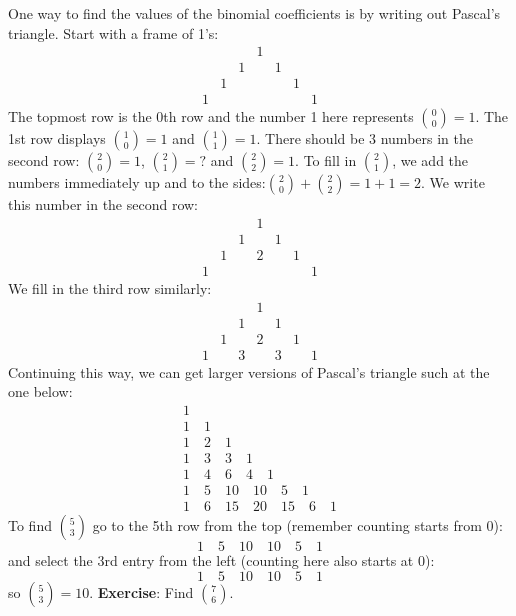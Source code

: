 One way to find the values of the binomial coefficients is by writing out Pascal's triangle. Start with a frame of 1's:
\begin{equation*}
    \begin{matrix}
         & & &1& & &\\ 
         & &1& &1& & \\ 
         &1& & & &1& \\
        1& & & & & &1
    \end{matrix}
\end{equation*}
The topmost row is the 0th row and the number 1 here represents $\binom{0}{0} = 1$. The 1st row displays $\binom{1}{0} = 1$ and $\binom{1}{1} = 1$. 
There should be 3 numbers in the second row: $\binom{2}{0} = 1$, $\binom{2}{1} = ?$ and $\binom{2}{2} = 1$. To fill in $\binom{2}{1}$, we add the numbers 
immediately up and to the sides:$\binom{2}{0} + \binom{2}{2} = 1 + 1 = 2$. We write this number in the second row:
\begin{equation*}
    \begin{matrix}
         & & &1& & &\\ 
         & &\boxed{1}& &\boxed{1}& & \\ 
         &1& &\boxed{2}& &1& \\
        1& & & & & &1
    \end{matrix}
\end{equation*}
We fill in the third row similarly:
\begin{equation*}
    \begin{matrix}
         & & &1& & &\\ 
         & &1& &1& & \\ 
         &1& &2& &1& \\
        1& &3& &3& &1
    \end{matrix}
\end{equation*}
Continuing this way, we can get larger versions of Pascal's triangle such at the one below:
\begin{equation*}
\begin{array}{c}
1\\
1\quad 1\\
1\quad 2\quad 1\\
1\quad 3\quad 3\quad 1\\
1\quad 4\quad 6\quad 4\quad 1\\
1\quad 5\quad 10\quad 10\quad 5\quad 1\\
1\quad 6\quad 15\quad 20\quad 15\quad 6\quad 1
\end{array}
\end{equation*}
To find $\binom{5}{3}$ go to the 5th row from the top (remember counting starts from 0):
\begin{equation*}
    1\quad 5\quad 10\quad 10\quad 5\quad 1
\end{equation*}
and select the 3rd entry from the left (counting here also starts at 0):
\begin{equation*}
    1\quad 5\quad 10\quad \boxed{10}\quad 5\quad 1
\end{equation*}
so $\binom{5}{3} = 10$. \textbf{Exercise}: Find $\binom{7}{6}$.


